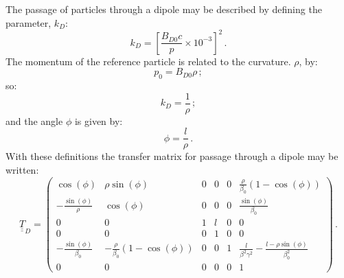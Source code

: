 The passage of particles through a dipole may be described by defining
the parameter, $k_D$:
\begin{equation}
  k_D = \left[ \frac{B_{D0} c}{p} \times 10^{-3} \right]^2\,.
  \label{Eq:EffectivekD}
\end{equation}
The momentum of the reference particle is related to the
curvature. $\rho$, by:
\begin{equation}
  p_0 = B_{D0} \rho \, ;
\end{equation}
so:
\begin{equation}
  k_D = \frac{1}{\rho} \, ; 
\end{equation}
and the angle $\phi$ is given by:
\begin{equation}
  \phi = \frac{l}{\rho} \, .
\end{equation}
With these definitions the transfer matrix for passage through a
dipole may be written:
\begin{equation}
  \underline{\underline{T}}_{D} =
    \begin{pmatrix}
                    \cos(\phi) &                                  \rho \sin(\phi) & 0 & 0 & 0 &                 \frac{\rho}{\beta_0}\left(1 - \cos(\phi) \right) \\
      -\frac{\sin(\phi)}{\rho} &                                       \cos(\phi) & 0 & 0 & 0 &                                       \frac{\sin(\phi)}{\beta_0} \\
                             0 &                                                0 & 1 & l & 0 &                                                                0 \\
                             0 &                                                0 & 0 & 1 & 0 &                                                                0 \\
   -\frac{\sin(\phi)}{\beta_0} &  -\frac{\rho}{\beta_0}\left(1 -\cos(\phi)\right) & 0 & 0 & 1 & \frac{l}{\beta^2 \gamma^2} - \frac{l - \rho\sin(\phi)}{\beta_0^2} \\
                             0 &                                                0 & 0 & 0 & 0 &                                                                1
        \end{pmatrix} \, .
\end{equation}
